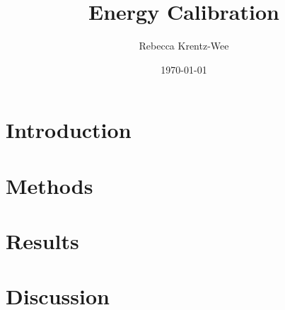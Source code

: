 \documentclass[11pt]{article}
\title{Energy Calibration}
\author{Rebecca Krentz-Wee}
\date{\today}
\begin{document}
\maketitle

\section*{Introduction}
\label{sec:intro}


\section*{Methods}
\label{sec:meth}


\section*{Results}
\label{sec:res}


\section*{Discussion}
\label{sec:disc}




\end{document}
